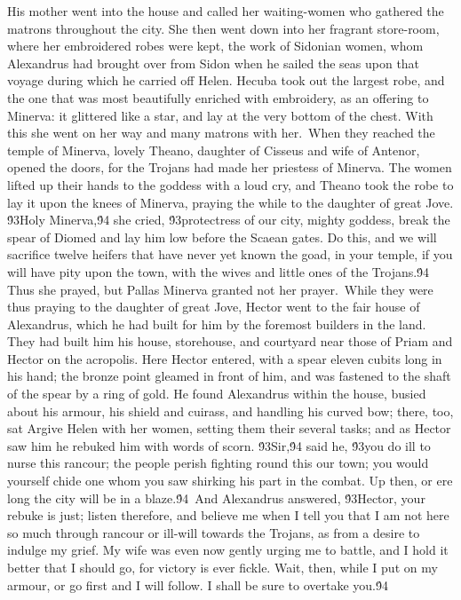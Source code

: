{His mother went into the house and called her waiting-women who gathered the matrons throughout the city. She then went down into her fragrant store-room, where her embroidered robes were kept, the work of Sidonian women, whom Alexandrus had brought over from Sidon when he sailed the seas upon that voyage during which he carried off Helen. Hecuba took out the largest robe, and the one that was most beautifully enriched with embroidery, as an offering to Minerva: it glittered like a star, and lay at the very bottom of the chest. With this she went on her way and many matrons with her.\
When they reached the temple of Minerva, lovely Theano, daughter of Cisseus and wife of Antenor, opened the doors, for the Trojans had made her priestess of Minerva. The women lifted up their hands to the goddess with a loud cry, and Theano took the robe to lay it upon the knees of Minerva, praying the while to the daughter of great Jove. \'93Holy Minerva,\'94 she cried, \'93protectress of our city, mighty goddess, break the spear of Diomed and lay him low before the Scaean gates. Do this, and we will sacrifice twelve heifers that have never yet known the goad, in your temple, if you will have pity upon the town, with the wives and little ones of the Trojans.\'94 Thus she prayed, but Pallas Minerva granted not her prayer.\
While they were thus praying to the daughter of great Jove, Hector went to the fair house of Alexandrus, which he had built for him by the foremost builders in the land. They had built him his house, storehouse, and courtyard near those of Priam and Hector on the acropolis. Here Hector entered, with a spear eleven cubits long in his hand; the bronze point gleamed in front of him, and was fastened to the shaft of the spear by a ring of gold. He found Alexandrus within the house, busied about his armour, his shield and cuirass, and handling his curved bow; there, too, sat Argive Helen with her women, setting them their several tasks; and as Hector saw him he rebuked him with words of scorn. \'93Sir,\'94 said he, \'93you do ill to nurse this rancour; the people perish fighting round this our town; you would yourself chide one whom you saw shirking his part in the combat. Up then, or ere long the city will be in a blaze.\'94\
And Alexandrus answered, \'93Hector, your rebuke is just; listen therefore, and believe me when I tell you that I am not here so much through rancour or ill-will towards the Trojans, as from a desire to indulge my grief. My wife was even now gently urging me to battle, and I hold it better that I should go, for victory is ever fickle. Wait, then, while I put on my armour, or go first and I will follow. I shall be sure to overtake you.\'94\
}
